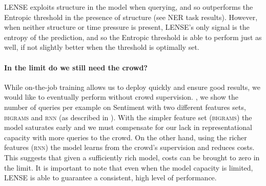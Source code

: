 
LENSE exploits structure in the model when querying, and so outperforms the Entropic threshold in the presence of structure (see NER task results).
However, when neither structure or time pressure is present, LENSE's only signal is the entropy of the prediction, and so the Entropic threshold is able to perform just as well, if not slightly better when the threshold is optimally set.


\paragraph{In the limit do we still need the crowd?}
While on-the-job training allows us to deploy quickly and ensure good results, we would like to eventually perform without crowd supervision.
, we show the number of queries per example on Sentiment with two different features sets, \textsc{bigrams} and \textsc{rnn} (as described in ).
With the simpler feature set (\textsc{bigrams}) 
the model saturates early and we must compensate for our lack in representational capacity with more queries to the crowd.
On the other hand, using the richer features (\textsc{rnn}) the model learns from the crowd's supervision and reduces costs.
This suggests that given a sufficiently rich model, costs can be brought to zero in the limit.
It is important to note that even when the model capacity is limited, LENSE is able to guarantee a consistent, high level of performance.


